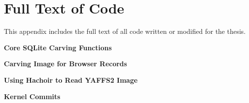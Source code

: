 \chapter{Full Text of Code}
This appendix includes the full text of all code written or modified for the thesis.

\center

\textbf{Core SQLite Carving Functions}


\textbf{Carving Image for Browser Records}


\textbf{Using Hachoir to Read YAFFS2 Image}


\textbf{Kernel Commits}

